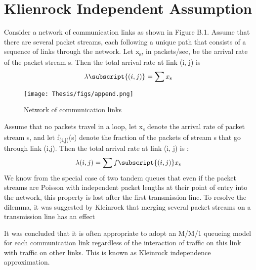 \chapter{Klienrock Independent Assumption}	\OnePageChapter         %
Consider a network of communication links as shown in Figure B.1. Assume that there are several packet streams, each following a unique path that consists of a sequence of links through the network. Let x\textsubscript{s}, in packets/sec, be the arrival rate of the packet stream s. Then the total arrival rate at link (i, j) is
\begin{equation}
    \lambda \subscript{(i,j)} = \sum x\textsubscript{s}
\end{equation}
\begin{figure}[h!]
    \centering
    \texttt{[image: Thesis/figs/append.png]}
    \caption{Network of communication links}
    \label{fig:my_label}
\end{figure}
Assume that no packets travel in a loop, let x\textsubscript{s} denote the arrival rate of packet
stream s, and let f\textsubscript{(i,j)}(s) denote the fraction of the packets of stream s that go through link (i,j). Then the total arrival rate at link (i, j) is :
\begin{equation}
    \lambda(i,j) = \sum f\subscript{(i,j)} x\textsubscript{s}
\end{equation}
We know from the special case of two tandem queues that even if the packet streams are
Poisson with independent packet lengths at their point of entry into the network, this
property is lost after the first transmission line. To resolve the dilemma, it was suggested
by Kleinrock that merging several packet streams on a transmission line has an effect
\par 
It was concluded that it is often appropriate to adopt an M/M/1 queueing model for each
communication link regardless of the interaction of traffic on this link with traffic on
other links. This is known as Kleinrock independence approximation.

